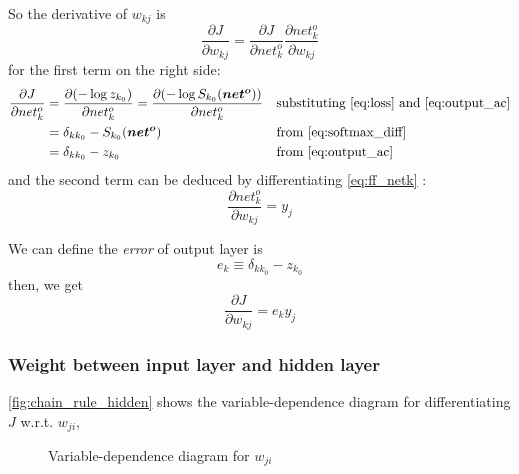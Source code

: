 \documentclass[12pt]{article}
\numberwithin{equation}{section}
\begin{document}
So the derivative of $w_{kj}$ is
\begin{equation}
    \frac{\partial J}{\partial w_{kj}} = \frac{\partial J}{\partial net^o_k}\frac{\partial net^o_k}{\partial w_{kj}}
\end{equation}
for the first term on the right side:
\begin{align} \label{eq:output_diff}
    \frac{\partial J}{\partial net^o_k} &= \frac{\partial( -\log z_{k_0})}{\partial net^o_k}  =   \frac{\partial( -\log S_{k_0}({\bm{net^o}}) )}{\partial net^o_k}     
                                                                                                                                         && \text{substituting \eqref{eq:loss} and \eqref{eq:output_ac}} \nonumber \\
                                                   &= \delta_{kk_0} - S_{k_0}({\bm{net^o}})                       && \text{from \eqref{eq:softmax_diff}} \nonumber \\
                                                   &= \delta_{kk_0} - z_{k_0}                                             && \text{from \eqref{eq:output_ac}}
\end{align}
and the second term can be deduced by differentiating \eqref{eq:ff_netk} :
\begin{equation}
    \frac{\partial net^o_k}{\partial w_{kj}} = y_j
\end{equation}

We can define the \textit{error} of output layer is
\begin{equation} \label{eq:output_err}
    e_k \equiv \delta_{kk_0} - z_{k_0}
\end{equation}
then, we get
\begin{equation}\label{eq:output_grad}
    \frac{\partial J}{\partial w_{kj}} = e_k y_j
\end{equation}


\subsubsection{Weight between input layer and hidden layer}
\autoref{fig:chain_rule_hidden} shows the variable-dependence diagram for differentiating $J$ w.r.t. $w_{ji}$,
\begin{figure}[ht]
\begin{center}
  
  
  \caption{Variable-dependence diagram for $w_{ji}$}
  \label{fig:chain_rule_hidden}
\end{center}
\end{figure}
\end{document}

